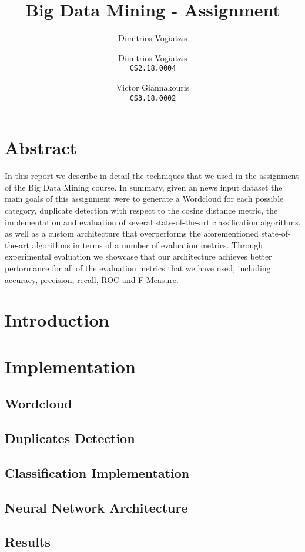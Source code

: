 \documentclass[]{article}
\title{Big Data Mining - Assignment}
\author{Dimitrios Vogiatzis}
\author{
	Dimitrios Vogiatzis\\
	\texttt{CS2.18.0004}
	\and
	Victor Giannakouris\\
	\texttt{CS3.18.0002}
}
\begin{document}
\date{}
\maketitle

\section{Abstract}
In this report we describe in detail the techniques that we used in the assignment of the Big Data Mining course. In summary, given an news input dataset the main goals of this assignment were to generate a Wordcloud for each possible category, duplicate detection with respect to the cosine distance metric, the implementation and evaluation of several state-of-the-art classification algorithms, as well as a custom architecture that overperforms the aforementioned state-of-the-art algorithms in terms of a number of evaluation metrics. Through experimental evaluation we showcase that our architecture achieves better performance for all of the evaluation metrics that we have used, including accuracy, precision, recall, ROC and F-Measure.
\section{Introduction}

\section{Implementation}
\subsection{Wordcloud}

\subsection{Duplicates Detection}

\subsection{Classification Implementation}

\subsection{Neural Network Architecture}

\subsection{Results}




\end{document}
